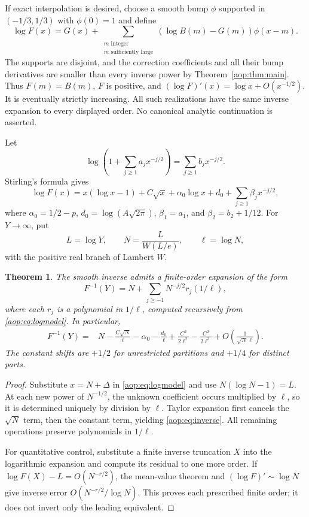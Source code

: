 \documentclass[11pt]{article}
\newtheorem{theorem}{Theorem}[section]
\theoremstyle{remark}\newtheorem{remark}[theorem]{Remark}
\begin{document}
If exact interpolation is desired, choose a smooth bump $\phi$ supported
in $(-1/3,1/3)$ with $\phi(0)=1$ and define
\begin{equation}\label{aop:eq:interpolant}
 \log F(x)=G(x)+\sum_{\substack{m\text{ integer}\\m\text{ sufficiently large}}}
       (\log B(m)-G(m))\phi(x-m).
\end{equation}
The supports are disjoint, and the correction coefficients and all
their bump derivatives are smaller than every inverse power by
Theorem~\ref{aop:thm:main}. Thus $F(m)=B(m)$, $F$ is positive, and
$(\log F)'(x)=\log x+O(x^{-1/2})$. It is eventually strictly increasing.
All such realizations have the same inverse expansion to every
displayed order. No canonical analytic continuation is asserted.

Let
\[
 \log\left(1+\sum_{j\ge1}a_jx^{-j/2}\right)
       =\sum_{j\ge1}b_jx^{-j/2}.
\]
Stirling's formula gives
\begin{equation}\label{aop:eq:logmodel}
 \log F(x)=x(\log x-1)+C\sqrt x+\alpha_0\log x+d_0
                         +\sum_{j\ge1}\beta_jx^{-j/2},
\end{equation}
where $\alpha_0=1/2-p$, $d_0=\log(A\sqrt{2\pi})$,
$\beta_1=a_1$, and $\beta_2=b_2+1/12$.
For $Y\to\infty$, put
\[
 L=\log Y,\qquad N=\frac{L}{W(L/e)},\qquad\ell=\log N,
\]
with the positive real branch of Lambert $W$.

\begin{theorem}\label{aop:thm:inverse}
The smooth inverse admits a finite-order expansion of the form
\[
 F^{-1}(Y)=N+\sum_{j\ge-1}N^{-j/2}r_j(1/\ell),
\]
where each $r_j$ is a polynomial in $1/\ell$, computed recursively
from \eqref{aop:eq:logmodel}. In particular,
\begin{align}\label{aop:eq:inverse}
 F^{-1}(Y)={}&N-\frac{C\sqrt N}{\ell}-\alpha_0-\frac{d_0}{\ell}
 +\frac{C^2}{2\ell^2}-\frac{C^2}{2\ell^3}
 +O\left(\frac1{\sqrt N\ell}\right).
\end{align}
The constant shifts are $+1/2$ for unrestricted partitions and
$+1/4$ for distinct parts.
\end{theorem}
\begin{proof}
Substitute $x=N+\Delta$ in \eqref{aop:eq:logmodel} and use
$N(\log N-1)=L$. At each new power of $N^{-1/2}$, the unknown
coefficient occurs multiplied by $\ell$, so it is determined uniquely
by division by $\ell$. Taylor expansion first cancels the
$\sqrt N$ term, then the constant term, yielding \eqref{aop:eq:inverse}.
All remaining operations preserve polynomials in $1/\ell$.

For quantitative control, substitute a finite inverse truncation $X$
into the logarithmic expansion and compute its residual to one more
order. If $\log F(X)-L=O(N^{-r/2})$, the mean-value theorem and
$(\log F)'\sim\log N$ give inverse error
$O(N^{-r/2}/\log N)$. This proves each prescribed finite order;
it does not invert only the leading equivalent.
\end{proof}
\end{document}
